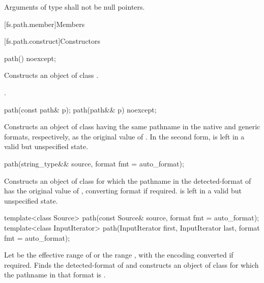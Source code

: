 \pnum
Arguments of type 
shall not be null pointers.

[fs.path.member]{Members}

[fs.path.construct]{Constructors}

%
\begin{itemdecl}
path() noexcept;
\end{itemdecl}

\begin{itemdescr}
\pnum
\effects Constructs an object of class .

\pnum
\ensures {}.
\end{itemdescr}

%
\begin{itemdecl}
path(const path& p);
path(path&& p) noexcept;
\end{itemdecl}

\begin{itemdescr}
\pnum
\effects
Constructs an object of class 
having the same pathname in the native and generic formats, respectively,
as the original value of .
In the second form,  is left in a valid but unspecified state.
\end{itemdescr}

%
\begin{itemdecl}
path(string_type&& source, format fmt = auto_format);
\end{itemdecl}

\begin{itemdescr}
\pnum
\effects
Constructs an object of class 
for which the pathname in the detected-format of 
has the original value of ,
converting format if required.
 is left in a valid but unspecified state.
\end{itemdescr}

%
\begin{itemdecl}
template<class Source>
  path(const Source& source, format fmt = auto_format);
template<class InputIterator>
  path(InputIterator first, InputIterator last, format fmt = auto_format);
\end{itemdecl}

\begin{itemdescr}
\pnum
\effects Let  be the effective range of 
or the range , with the encoding converted if required.
Finds the detected-format of 
and constructs an object of class 
for which the pathname in that format is .
\end{itemdescr}

